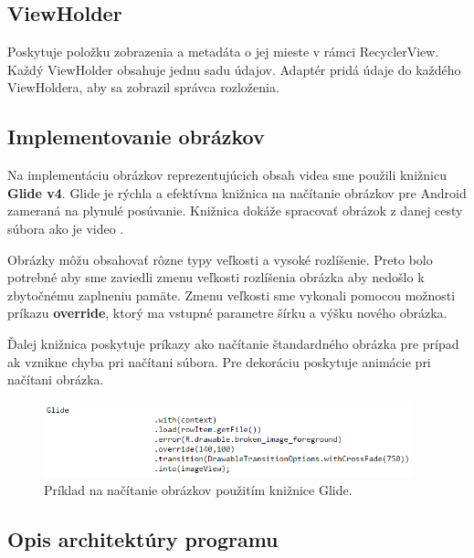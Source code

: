 \documentclass[12pt, oneside]{book}
\begin{document}
\subsection{ViewHolder}

\hspace{15pt} Poskytuje položku zobrazenia a metadáta o jej mieste v rámci RecyclerView. Každý ViewHolder obsahuje jednu sadu údajov. Adaptér pridá údaje do každého ViewHoldera, aby sa zobrazil správca rozloženia.

\subsection{Implementovanie obrázkov}

\hspace{15pt} Na implementáciu obrázkov reprezentujúcich obsah videa sme použili knižnicu \textbf{Glide v4}. Glide je rýchla a efektívna knižnica na načítanie obrázkov pre Android zameraná na plynulé posúvanie. Knižnica dokáže spracovať obrázok z danej cesty súbora ako je video \cite{glide}.

Obrázky môžu obsahovať rôzne typy veľkosti a vysoké rozlíšenie. Preto bolo potrebné aby sme zaviedli zmenu veľkosti rozlíšenia obrázka aby nedošlo k zbytočnému zaplneniu pamäte. Zmenu veľkosti sme vykonali pomocou možnosti príkazu \textbf{override}, ktorý ma vstupné parametre šírku a výšku nového obrázka. 

Ďalej knižnica poskytuje príkazy ako načítanie štandardného obrázka pre prípad ak vznikne chyba pri načítani súbora. Pre dekoráciu poskytuje animácie pri načítani obrázka.

\begin{figure}[h]
    \centering
    \includegraphics[width=0.95\textwidth]{images/glide.png}
    \caption{Príklad na načítanie obrázkov použitím knižnice Glide. }
    \label{fig:obr14}
\end{figure}

\subsection{Opis architektúry programu}
\end{document}
